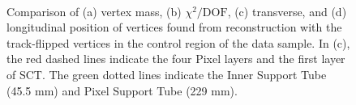 \begin{figure}[!htb]
    \centering
     \\
    \caption{Comparison of (a) vertex mass, (b) $\chi^{2} / \mathrm{DOF}$, (c) transverse, and (d) longitudinal position of vertices found from reconstruction with the track-flipped vertices in the control region of the data sample. In (c), the red dashed lines indicate the four Pixel layers and the first layer of SCT. The green dotted lines indicate the Inner Support Tube (45.5 mm) and Pixel Support Tube (229 mm).}
    \label{fig:random-crossing_vertex_dist_data}
\end{figure}


